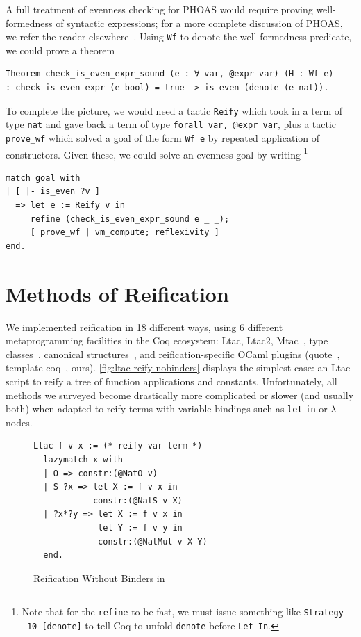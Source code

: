 A full treatment of evenness checking for PHOAS would require proving well-formedness of syntactic expressions; for a more complete discussion of PHOAS, we refer the reader elsewhere~\cite{PhoasICFP08}.
Using \texttt{Wf} to denote the well-formedness predicate, we could prove a theorem
\begin{verbatim}
Theorem check_is_even_expr_sound (e : ∀ var, @expr var) (H : Wf e)
: check_is_even_expr (e bool) = true -> is_even (denote (e nat)).
\end{verbatim}
To complete the picture, we would need a tactic \texttt{Reify} which took in a term of type \texttt{nat} and gave back a term of type \texttt{forall var, @expr var}, plus a tactic \texttt{prove\_wf} which solved a goal of the form \texttt{Wf e} by repeated application of constructors.
Given these, we could solve an evenness goal by writing%
\footnote{%
  Note that for the \texttt{refine} to be fast, we must issue something like \texttt{Strategy -10 [denote]} to tell Coq to unfold \texttt{denote} before \texttt{Let\_In}.
  }
\begin{verbatim}
match goal with
| [ |- is_even ?v ]
  => let e := Reify v in
     refine (check_is_even_expr_sound e _ _);
     [ prove_wf | vm_compute; reflexivity ]
end.
\end{verbatim}

\section{Methods of Reification} \label{sec:reif-survey}

We implemented reification in 18 different ways, using 6 different metaprogramming facilities in the Coq ecosystem: Ltac, Ltac2, Mtac~\cite{lessadhoc}, type classes~\cite{sozeau2008first}, canonical structures~\cite{gonthier2016small}, and reification-specific OCaml plugins (quote~\cite{quote-plugin}, template-coq~\cite{TemplateCoq}, ours).
\autoref{fig:ltac-reify-nobinders} displays the simplest case: an Ltac script to reify a tree of function applications and constants.
Unfortunately, all methods we surveyed become drastically more complicated or slower (and usually both) when adapted to reify terms with variable bindings such as \texttt{let}-\texttt{in} or \texttt{$\lambda$} nodes.

\begin{figure}
\begin{verbatim}
Ltac f v x := (* reify var term *)
  lazymatch x with
  | O => constr:(@NatO v)
  | S ?x => let X := f v x in
            constr:(@NatS v X)
  | ?x*?y => let X := f v x in
             let Y := f v y in
             constr:(@NatMul v X Y)
  end.
\end{verbatim}
\caption{Reification Without Binders in \Ltac}\label{fig:ltac-reify-nobinders}
\end{figure}


